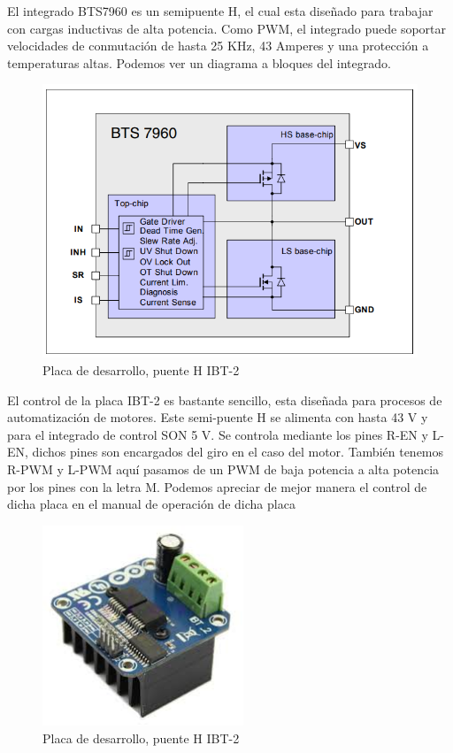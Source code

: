 El integrado BTS7960 es un semipuente H, el cual esta diseñado para trabajar con cargas inductivas de alta potencia. Como PWM, el integrado puede soportar velocidades de conmutación de hasta 25 KHz, 43 Amperes y una protección a temperaturas altas.  Podemos ver un diagrama a bloques del integrado.   


\begin{figure}[H]
\centering
\includegraphics[width=12cm]{Capitulo3/figs/bts69.PNG}
\caption{Placa de desarrollo, puente H IBT-2\cite{c21}}
\end{figure}

El control de la placa IBT-2 es bastante sencillo, esta diseñada para procesos de automatización de motores. Este semi-puente H se alimenta con hasta 43 V y  para el integrado de control SON 5 V. Se controla mediante los pines R-EN y L-EN, dichos pines son encargados del giro en el caso del motor. También tenemos R-PWM y L-PWM aquí pasamos de un PWM de baja potencia a alta potencia por los pines con la letra M. Podemos apreciar de mejor manera el control de dicha placa en el manual de operación de dicha placa \cite{c21}



\begin{figure}[H]
\centering
\includegraphics[width=6cm]{Capitulo3/figs/bts.jpg}
\caption{Placa de desarrollo, puente H IBT-2\cite{c21}}
\end{figure}



